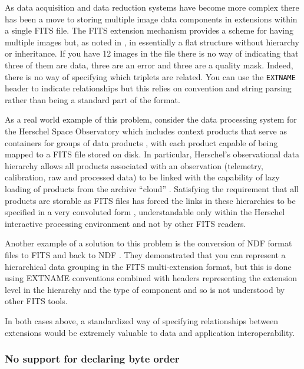 \documentclass[final,authoryear,5p,times,twocolumn]{elsarticle}
\begin{document}
{{As data acquisition and data reduction systems have become more
complex there has been a move to storing multiple image data
components in extensions within a single FITS file. The FITS extension
mechanism provides a scheme for having multiple images but, as noted
in \citet{2003ASSL..285...71G}, in essentially a flat structure
without hierarchy or inheritance. If you have 12 images in the file
there is no way of indicating that three of them are data, three are an error
and three are a quality mask. Indeed, there is no way of specifying which
triplets are related. You can use the \texttt{EXTNAME} header to
indicate relationships but this relies on convention and string
parsing rather than being a standard part of the format.


As a real world example of this problem, consider the data processing 
system for the Herschel Space Observatory which includes 
context products that serve as containers for groups of data products 
\citep{Herschel_context}, with each product capable of being mapped to a 
FITS file stored on disk. In particular, Herschel's observational data 
hierarchy allows all products associated with an observation (telemetry, 
calibration, raw and processed data) to be linked with the capability of 
lazy loading of products from the archive ``cloud'' \citep{Herschel_obscontext}. 
Satisfying the requirement that all products are storable as FITS files 
has forced the links in these hierarchies to be specified in a very 
convoluted form \citep{Herschel_spire_context}, understandable only within the 
Herschel interactive processing environment
\citep[HIPE;][]{2010ASPC..434..139O} and not by other FITS readers.


Another example of a solution to this problem is the conversion of NDF 
format files to FITS and back to NDF \citep{SUN55,1997STARB..19...14C}.
They demonstrated that you can represent a hierarchical data grouping 
in the FITS multi-extension format, but this is done using EXTNAME 
conventions combined with headers representing the extension level in 
the hierarchy and the type of component and so is not understood by 
other FITS tools. 

In both cases above, a standardized way of specifying relationships 
between extensions would be extremely valuable to data and application interoperability.


\subsubsection{No support for declaring byte order}
\label{section_byte_order}

}}
\end{document}
